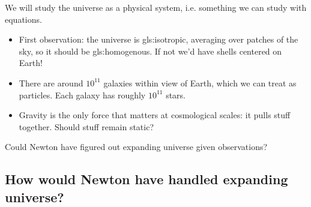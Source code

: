 \documentclass[]{article}
\begin{document}
We will study the universe as a physical system, i.e. something we can study with equations.

\begin{itemize}
	\item First observation: the universe is \gls{gls:isotropic}, averaging over patches of the sky, so it should be \gls{gls:homogenous}. If not we'd have shells centered on Earth!

	\item There are around $10^{11}$ galaxies within view of Earth, which we can treat as particles. Each galaxy has roughly $10^{11}$ stars.
	
	\item Gravity is the only force that matters at cosmological scales: it pulls stuff together. Should stuff remain static?
\end{itemize}

Could Newton have figured out expanding universe given observations?

\subsection{How would Newton have handled expanding universe?}
\end{document}
